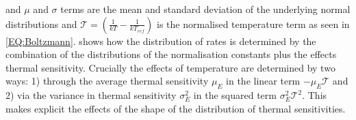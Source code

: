 \documentclass{article}
\begin{document}
and $\mu$ and $\sigma$ terms are the mean and standard deviation of the underlying normal distributions and $\mathcal{T} = \left(\frac{1}{kT} - \frac{1}{k T_{ref} }\right)$ is the normalised temperature term as seen in \cref{EQ:Boltzmann}.  shows how the distribution of rates is determined by the combination of the distributions of the normalisation constants plus the effects thermal sensitivity. Crucially the effects of temperature are determined by two ways: 1) through the average thermal sensitivity $\mu_{E}$  in the linear term $-\mu_{E} \mathcal{T}$ and 2) via the variance in thermal sensitivity $\sigma_E^2$ in the squared term $\sigma_E^2 \mathcal{T}^2$. This makes explicit the effects of the shape of the distribution of thermal sensitivities.
\end{document}
